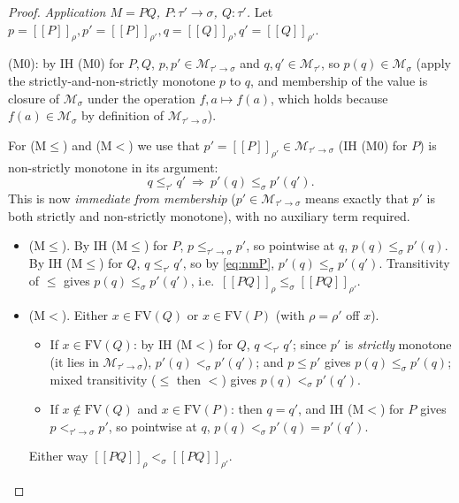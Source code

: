 \documentclass{amsart}
\theoremstyle{definition}
\newcommand{\interp}[1]{[\![#1]\!]}
\newcommand{\FV}{\mathrm{FV}}
\begin{document}
\begin{proof}
\medskip\noindent\emph{Application $M=PQ$, $P:\tau'\to\sigma$, $Q:\tau'$.}
Let $p=\interp{P}_\rho,p'=\interp{P}_{\rho'},q=\interp{Q}_\rho,q'=\interp{Q}_{\rho'}$.

(M0): by IH \textup{(M0)} for $P,Q$, $p,p'\in\mathcal M_{\tau'\to\sigma}$ and
$q,q'\in\mathcal M_{\tau'}$, so $p(q)\in\mathcal M_\sigma$ (apply the strictly-and-non-strictly
monotone $p$ to $q$, and membership of the value is closure of $\mathcal M_\sigma$ under the
operation $f,a\mapsto f(a)$, which holds because $f(a)\in\mathcal M_\sigma$ by definition of
$\mathcal M_{\tau'\to\sigma}$).

For (M$\le$) and (M$<$) we use that $p'=\interp{P}_{\rho'}\in\mathcal M_{\tau'\to\sigma}$
(IH (M0) for $P$) is non-strictly monotone in its argument:
\begin{equation}\label{eq:nmP}
  q\le_{\tau'}q'\ \Longrightarrow\ p'(q)\le_\sigma p'(q').
\end{equation}
This is now \emph{immediate from membership} ($p'\in\mathcal M_{\tau'\to\sigma}$ means
exactly that $p'$ is both strictly and non-strictly monotone), with no auxiliary term
required.
\begin{itemize}
\item (M$\le$). By IH \textup{(M$\le$)} for $P$, $p\le_{\tau'\to\sigma}p'$, so pointwise at
  $q$, $p(q)\le_\sigma p'(q)$. By IH \textup{(M$\le$)} for $Q$, $q\le_{\tau'}q'$, so by
  \eqref{eq:nmP}, $p'(q)\le_\sigma p'(q')$. Transitivity of $\le$ gives
  $p(q)\le_\sigma p'(q')$, i.e.\ $\interp{PQ}_\rho\le_\sigma\interp{PQ}_{\rho'}$.
\item (M$<$). Either $x\in\FV(Q)$ or $x\in\FV(P)$ (with $\rho=\rho'$ off $x$).
  \begin{itemize}
  \item If $x\in\FV(Q)$: by IH \textup{(M$<$)} for $Q$, $q<_{\tau'}q'$; since $p'$ is
    \emph{strictly} monotone (it lies in $\mathcal M_{\tau'\to\sigma}$), $p'(q)<_\sigma p'(q')$;
    and $p\le p'$ gives $p(q)\le_\sigma p'(q)$; mixed transitivity ($\le$ then $<$) gives
    $p(q)<_\sigma p'(q')$.
  \item If $x\notin\FV(Q)$ and $x\in\FV(P)$: then $q=q'$, and IH \textup{(M$<$)} for $P$
    gives $p<_{\tau'\to\sigma}p'$, so pointwise at $q$, $p(q)<_\sigma p'(q)=p'(q')$.
  \end{itemize}
  Either way $\interp{PQ}_\rho<_\sigma\interp{PQ}_{\rho'}$.
\end{itemize}
\end{proof}
\end{document}
